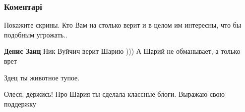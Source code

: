  
 
 
 
 
\subsubsection{Коментарі}
\label{sec:19_08_2021.fb.medvedeva_olesja.1.sharij.cmt}

\begin{itemize}
 
Покажите скрины. Кто Вам на столько верит и в целом им интересны, что бы подобным угрожать..

\begin{itemize}
 
\textbf{Денис Заиц} Ник Вуйчич верит Шарию )))
А Шарий не обманывает, а только врет

 
Здец ты животное тупое.
\end{itemize}

 
Олеся, держись! Про Шария ты сделала классные блоги. Выражаю свою поддержку

\begin{itemize}
 

\end{itemize}
\end{itemize}
